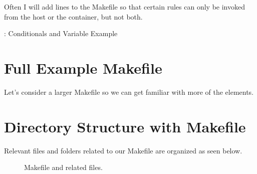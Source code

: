 \justifying
Often I will add lines to the Makefile so that certain rules can only be invoked from the host or the container, but not both.

\begin{mybox}{\thetcbcounter: Conditionals and Variable Example}
	
\end{mybox}

\section{Full Example Makefile}
\justifying
Let's consider a larger Makefile so we can get familiar with more of the elements.

\section{Directory Structure with Makefile}

\justifying
Relevant files and folders related to our Makefile are organized as seen below.

\begin{figure}[!htb]
	
	\caption{Makefile and related files.}
\label{makefile}
\end{figure}

